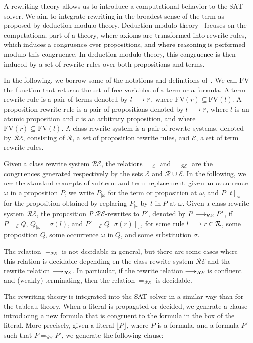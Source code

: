 A rewriting theory allows us to introduce a computational behavior to the SAT
solver. We aim to integrate rewriting in the broadest sense of the term as
proposed by deduction modulo theory. Deduction modulo theory~\cite{DA03} focuses
on the computational part of a theory, where axioms are transformed into rewrite
rules, which induces a congruence over propositions, and where reasoning is
performed modulo this congruence. In deduction modulo theory, this congruence is
then induced by a set of rewrite rules over both propositions and terms.

In the following, we borrow some of the notations and definitions
of~\cite{DA03}. We call $\mathrm{FV}$ the function that returns the set of
free variables of a term or a formula. A term rewrite rule is a pair of terms
denoted by $l\longrightarrow{}r$, where $\mathrm{FV}(r)\subseteq\mathrm{FV}(l)$. A
proposition rewrite rule is a pair of propositions denoted by $l\longrightarrow{}r$, where
$l$ is an atomic proposition and $r$ is an arbitrary proposition, and where
$\mathrm{FV}(r)\subseteq\mathrm{FV}(l)$. A class rewrite system is a pair of
rewrite systems, denoted by $\mathcal{RE}$, consisting of $\mathcal{R}$, a set
of proposition rewrite rules, and $\mathcal{E}$, a set of term rewrite rules.

Given a class rewrite system $\mathcal{RE}$, the relations $=_\mathcal{E}$ and
$=_\mathcal{RE}$ are the congruences generated respectively by the sets
$\mathcal{E}$ and $\mathcal{R}\cup\mathcal{E}$. In the following, we use the
standard concepts of subterm and term replacement: given an occurrence $\omega$
in a proposition $P$, we write $P_{|\omega}$ for the term or proposition at
$\omega$, and $P[t]_\omega$ for the proposition obtained by replacing
$P_{|\omega}$ by $t$ in $P$ at $\omega$. Given a class rewrite system
$\mathcal{RE}$, the proposition $P$ $\mathcal{RE}$-rewrites to $P'$, denoted by
$P\longrightarrow_\mathcal{RE}P'$, if $P=_\mathcal{E}Q$, $Q_{|\omega}=\sigma(l)$, and
$P'=_\mathcal{E}Q[\sigma(r)]_\omega$, for some rule $l\longrightarrow{}r\in\mathcal{R}$,
some proposition $Q$, some occurrence $\omega$ in $Q$, and some substitution
$\sigma$.

The relation $=_\mathcal{RE}$ is not decidable in general, but there are some
cases where this relation is decidable depending on the class rewrite system
$\mathcal{RE}$ and the rewrite relation $\longrightarrow_\mathcal{RE}$. In particular, if
the rewrite relation $\longrightarrow_\mathcal{RE}$ is confluent and (weakly) terminating,
then the relation $=_\mathcal{RE}$ is decidable.

The rewriting theory is integrated into the SAT solver in a similar way than for
the tableau theory. When a literal is propagated or decided, we generate a
clause introducing a new formula that is congruent to the formula in the box of
the literal. More precisely, given a literal $\lfloor{}P\rfloor$, where $P$ is a
formula, and a formula $P'$ such that $P=_\mathcal{RE}P'$, we generate the
following clause:

